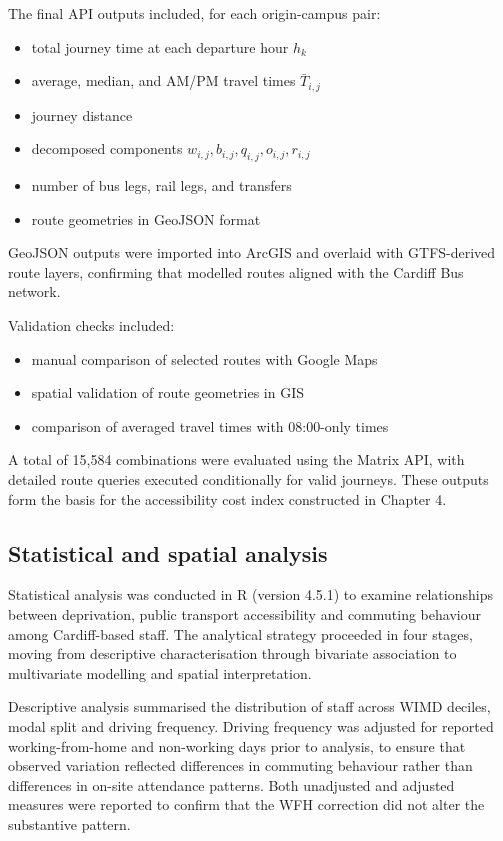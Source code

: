 \documentclass[11pt,a4paper]{article}
\begin{document}
The final API outputs included, for each origin-campus pair:

\begin{itemize}
    \item total journey time at each departure hour \(h_k\)
    \item average, median, and AM/PM travel times \(\bar{T}_{i,j}\)
    \item journey distance
    \item decomposed components \(w_{i,j}, b_{i,j}, q_{i,j}, o_{i,j}, r_{i,j}\)
    \item number of bus legs, rail legs, and transfers
    \item route geometries in GeoJSON format
\end{itemize}

GeoJSON outputs were imported into ArcGIS and overlaid with GTFS-derived route layers, confirming that modelled routes aligned with the Cardiff Bus network.

Validation checks included:

\begin{itemize}
    \item manual comparison of selected routes with Google Maps
    \item spatial validation of route geometries in GIS
    \item comparison of averaged travel times with 08:00-only times
\end{itemize}

A total of 15,584 combinations were evaluated using the Matrix API, with detailed route queries executed conditionally for valid journeys. These outputs form the basis for the accessibility cost index constructed in Chapter 4.


\subsection{Statistical and spatial analysis}

Statistical analysis was conducted in R (version 4.5.1) to examine relationships between deprivation, public transport accessibility and commuting behaviour among Cardiff-based staff. The analytical strategy proceeded in four stages, moving from descriptive characterisation through bivariate association to multivariate modelling and spatial interpretation.

Descriptive analysis summarised the distribution of staff across WIMD deciles, modal split and driving frequency. Driving frequency was adjusted for reported working-from-home and non-working days prior to analysis, to ensure that observed variation reflected differences in commuting behaviour rather than differences in on-site attendance patterns. Both unadjusted and adjusted measures were reported to confirm that the WFH correction did not alter the substantive pattern.
\end{document}
